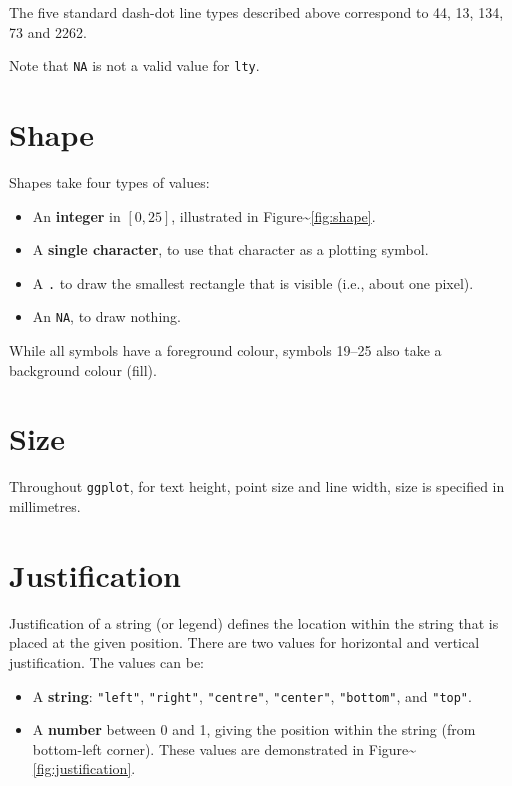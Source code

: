 The five standard dash-dot line types described above correspond to 44,
13, 134, 73 and 2262.

Note that \texttt{NA} is not a valid value for \texttt{lty}.

\section{Shape}\label{sec:shape-spec}

Shapes take four types of values: 

\begin{itemize}
\itemsep1pt\parskip0pt
\item
  An \textbf{integer} in $[0, 25]$, illustrated in
  Figure\textasciitilde{}\ref{fig:shape}.
\item
  A \textbf{single character}, to use that character as a plotting
  symbol.\\
\item
  A \texttt{.} to draw the smallest rectangle that is visible (i.e.,
  about one pixel).
\item
  An \texttt{NA}, to draw nothing.
\end{itemize}

While all symbols have a foreground colour, symbols 19--25 also take a
background colour (fill).

\section{Size}\label{sec:size}

Throughout \texttt{ggplot}, for text height, point size and line width,
size is specified in millimetres. 

\section{Justification}\label{sec:justification-spec}

Justification of a string (or legend) defines the location within the
string that is placed at the given position. There are two values for
horizontal and vertical justification. The values can be:
  

\begin{itemize}
\itemsep1pt\parskip0pt
\item
  A \textbf{string}: \texttt{"left"}, \texttt{"right"},
  \texttt{"centre"}, \texttt{"center"}, \texttt{"bottom"}, and
  \texttt{"top"}.
\item
  A \textbf{number} between 0 and 1, giving the position within the
  string (from bottom-left corner). These values are demonstrated in
  Figure\textasciitilde{}\ref{fig:justification}.
\end{itemize}

